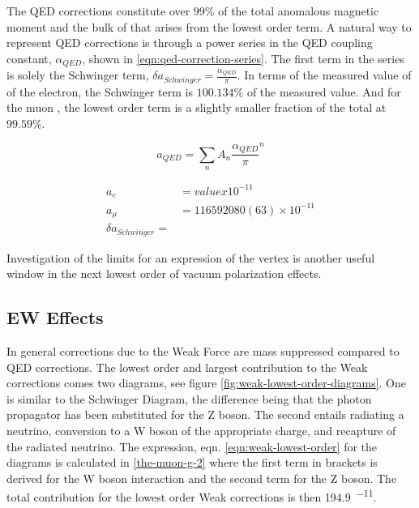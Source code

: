The QED corrections constitute over 99\% of the total anomalous magnetic moment and the bulk of that arises from the lowest order term.  A natural way to represent QED corrections is through a power series in the QED coupling constant, $\alpha_{QED}$, shown in \ref{eqn:qed-correction-series}.  The first term in the series is solely the Schwinger term, $\delta a_{Schwinger} = \frac{\alpha_{QED}}{\pi}$.  In terms of the measured value of \gmtwo of the electron, the Schwinger term is $100.134\%$ of the measured value. And for the muon \gmtwo, the lowest order term is a slightly smaller fraction of the total at $99.59\%$.

\begin{equation}
\label{eqn:qed-correction-series}
a_{QED} = \sum_n{A_n\frac{\alpha_{QED}}{\pi}^n}
\end{equation}

\begin{align*}
a_{e} & = value x 10^{-11} \\
a_{\mu} & = 11 659 2080(63) \times 10^{-11} \\
\delta a_{Schwinger} = 
\end{align*}

Investigation of the limits for an expression of the vertex is another useful window in the next lowest order of vacuum polarization effects.  

\subsection{EW Effects} \label{sec:theory-ew}

In general corrections due to the Weak Force are mass suppressed compared to QED corrections.  The lowest order and largest contribution to the Weak corrections comes two diagrams, see figure \ref{fig:weak-lowest-order-diagrams}. One is similar to the Schwinger Diagram, the difference being that the photon propagator has been substituted for the Z boson.  The second entails radiating  a neutrino, conversion to a W boson of the appropriate charge, and recapture of the radiated neutrino.  The expression, eqn. \ref{eqn:weak-lowest-order} for the diagrams is calculated in \ref{the-muon-g-2} where the first term in brackets is derived for the W boson interaction and the second term for the Z boson.  The total contribution for the lowest order Weak corrections is then \SI{194.9}{^{-11}}.

